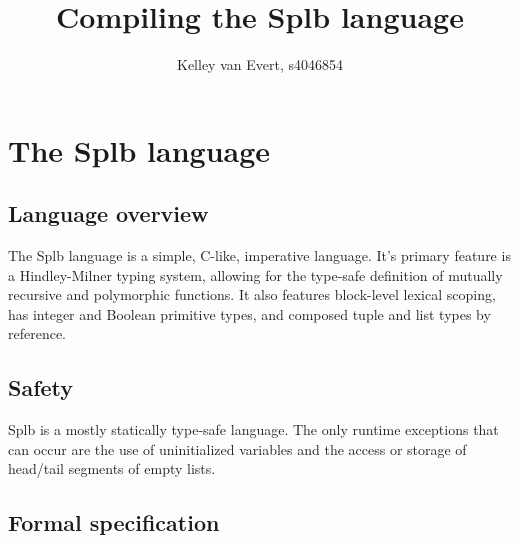 \documentclass[10pt]{article} %
\title{Compiling the Splb language}
\author{Kelley van Evert, s4046854}
\theoremstyle{definitionstyle}
\theoremstyle{lemmastyle}
\begin{document}
\maketitle


\setcounter{tocdepth}{2} %
\tableofcontents

\section{The Splb language}

\subsection{Language overview}

The Splb language is a simple, C-like, imperative language. It's primary feature is a Hindley-Milner typing system, allowing for the type-safe definition of mutually recursive and polymorphic functions. It also features block-level lexical scoping, has integer and Boolean primitive types, and composed tuple and list types by reference.


\subsection{Safety}

Splb is a mostly statically type-safe language. The only runtime exceptions that can occur are the use of uninitialized variables and the access or storage of head/tail segments of empty lists.


\subsection{Formal specification}
\end{document}
